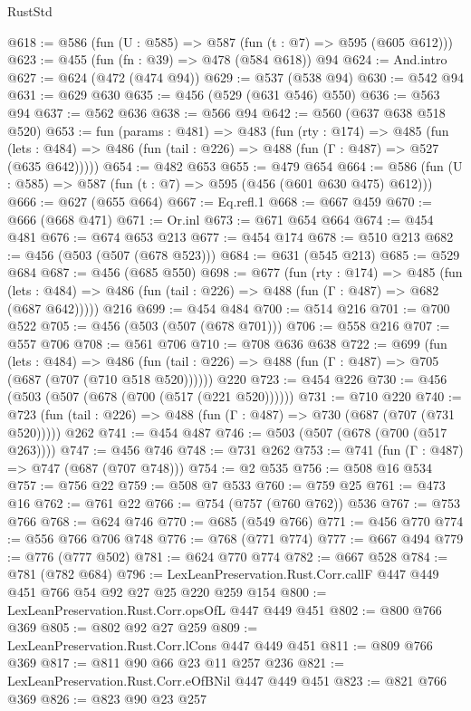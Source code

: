 \begin{lexlean}{RustStd}
\begin{coremodule}
@618 := @586 (fun (U : @585) => @587 (fun (t : @7) => @595 (@605 @612)))
@623 := @455 (fun (fn : @39) => @478 (@584 @618)) @94
@624 := And.intro
@627 := @624 (@472 (@474 @94))
@629 := @537 (@538 @94)
@630 := @542 @94
@631 := @629 @630
@635 := @456 (@529 (@631 @546) @550)
@636 := @563 @94
@637 := @562 @636
@638 := @566 @94
@642 := @560 (@637 @638 @518 @520)
@653 := fun (params : @481) =>
  @483
    (fun (rty : @174) =>
    @485
      (fun (lets : @484) => @486 (fun (tail : @226) => @488 (fun (Γ : @487) => @527 (@635 @642)))))
@654 := @482 @653
@655 := @479 @654
@664 := @586 (fun (U : @585) => @587 (fun (t : @7) => @595 (@456 (@601 @630 @475) @612)))
@666 := @627 (@655 @664)
@667 := Eq.refl.{1}
@668 := @667 @459
@670 := @666 (@668 @471)
@671 := Or.inl
@673 := @671 @654 @664
@674 := @454 @481
@676 := @674 @653 @213
@677 := @454 @174
@678 := @510 @213
@682 := @456 (@503 (@507 (@678 @523)))
@684 := @631 (@545 @213)
@685 := @529 @684
@687 := @456 (@685 @550)
@698 := @677
    (fun (rty : @174) =>
    @485
      (fun (lets : @484) => @486 (fun (tail : @226) => @488 (fun (Γ : @487) => @682 (@687 @642)))))
    @216
@699 := @454 @484
@700 := @514 @216
@701 := @700 @522
@705 := @456 (@503 (@507 (@678 @701)))
@706 := @558 @216
@707 := @557 @706
@708 := @561 @706
@710 := @708 @636 @638
@722 := @699
    (fun (lets : @484) =>
    @486 (fun (tail : @226) => @488 (fun (Γ : @487) => @705 (@687 (@707 (@710 @518 @520))))))
    @220
@723 := @454 @226
@730 := @456 (@503 (@507 (@678 (@700 (@517 (@221 @520))))))
@731 := @710 @220
@740 := @723 (fun (tail : @226) => @488 (fun (Γ : @487) => @730 (@687 (@707 (@731 @520))))) @262
@741 := @454 @487
@746 := @503 (@507 (@678 (@700 (@517 @263))))
@747 := @456 @746
@748 := @731 @262
@753 := @741 (fun (Γ : @487) => @747 (@687 (@707 @748)))
@754 := @2 @535
@756 := @508 @16 @534
@757 := @756 @22
@759 := @508 @7 @533
@760 := @759 @25
@761 := @473 @16
@762 := @761 @22
@766 := @754 (@757 (@760 @762)) @536
@767 := @753 @766
@768 := @624 @746
@770 := @685 (@549 @766)
@771 := @456 @770
@774 := @556 @766 @706 @748
@776 := @768 (@771 @774)
@777 := @667 @494
@779 := @776 (@777 @502)
@781 := @624 @770 @774
@782 := @667 @528
@784 := @781 (@782 @684)
@796 := LexLeanPreservation.Rust.Corr.callF @447 @449 @451 @766 @54 @92 @27 @25 @220 @259 @154
@800 := LexLeanPreservation.Rust.Corr.opsOfL @447 @449 @451
@802 := @800 @766 @369
@805 := @802 @92 @27 @259
@809 := LexLeanPreservation.Rust.Corr.lCons @447 @449 @451
@811 := @809 @766 @369
@817 := @811 @90 @66 @23 @11 @257 @236
@821 := LexLeanPreservation.Rust.Corr.eOfBNil @447 @449 @451
@823 := @821 @766 @369
@826 := @823 @90 @23 @257

\end{coremodule}
\end{lexlean}
